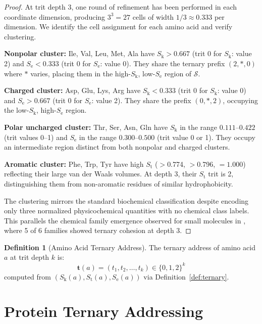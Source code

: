 \documentclass[11pt,twocolumn,a4paper]{article}
\theoremstyle{definition}
\newtheorem{definition}[theorem]{Definition}
\theoremstyle{remark}
\newcommand{\Sk}{S_{\mathrm{k}}}
\newcommand{\St}{S_{\mathrm{t}}}
\newcommand{\Se}{S_{\mathrm{e}}}
\newcommand{\Sspace}{\mathcal{S}}
\begin{document}
\begin{proof}
At trit depth 3, one round of refinement has been performed in each coordinate dimension, producing $3^3 = 27$ cells of width $1/3 \approx 0.333$ per dimension. We identify the cell assignment for each amino acid and verify clustering.

\textbf{Nonpolar cluster:} Ile, Val, Leu, Met, Ala have $\Sk > 0.667$ (trit 0 for $\Sk$: value 2) and $\Se < 0.333$ (trit 0 for $\Se$: value 0). They share the ternary prefix $(2, *, 0)$ where $*$ varies, placing them in the high-$\Sk$, low-$\Se$ region of $\Sspace$.

\textbf{Charged cluster:} Asp, Glu, Lys, Arg have $\Sk < 0.333$ (trit 0 for $\Sk$: value 0) and $\Se > 0.667$ (trit 0 for $\Se$: value 2). They share the prefix $(0, *, 2)$, occupying the low-$\Sk$, high-$\Se$ region.

\textbf{Polar uncharged cluster:} Thr, Ser, Asn, Gln have $\Sk$ in the range $0.111$--$0.422$ (trit values 0--1) and $\Se$ in the range $0.300$--$0.500$ (trit value 0 or 1). They occupy an intermediate region distinct from both nonpolar and charged clusters.

\textbf{Aromatic cluster:} Phe, Trp, Tyr have high $\St$ ($>$0.774, $>$0.796, $= 1.000$) reflecting their large van der Waals volumes. At depth 3, their $\St$ trit is 2, distinguishing them from non-aromatic residues of similar hydrophobicity.

The clustering mirrors the standard biochemical classification \citep{branden1999, creighton1993} despite encoding only three normalized physicochemical quantities with no chemical class labels. This parallels the chemical family emergence observed for small molecules in \citet{sachikonye2025a}, where 5 of 6 families showed ternary cohesion at depth 3.
\end{proof}

\begin{definition}[Amino Acid Ternary Address]
\label{def:aa_address}
The ternary address of amino acid $a$ at trit depth $k$ is:
\begin{equation}
\mathbf{t}(a) = (t_1, t_2, \ldots, t_k) \in \{0,1,2\}^k
\end{equation}
computed from $(\Sk(a), \St(a), \Se(a))$ via Definition~\ref{def:ternary}.
\end{definition}



\section{Protein Ternary Addressing}
\label{sec:protein_addressing}
\end{document}
